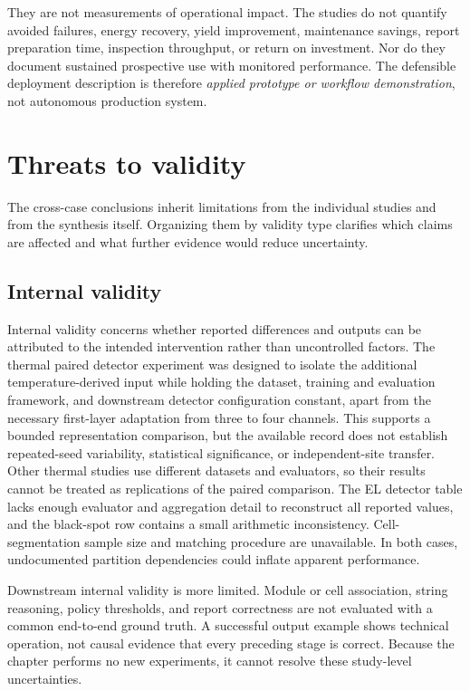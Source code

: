 \documentclass[12pt,a4paper]{report}
\begin{document}
They are not measurements of operational impact. The studies do not quantify avoided failures, energy recovery, yield improvement, maintenance savings, report preparation time, inspection throughput, or return on investment. Nor do they document sustained prospective use with monitored performance. The defensible deployment description is therefore \emph{applied prototype or workflow demonstration}, not autonomous production system.

\section{Threats to validity}
\label{sec:ch07-validity}

The cross-case conclusions inherit limitations from the individual studies and from the synthesis itself. Organizing them by validity type clarifies which claims are affected and what further evidence would reduce uncertainty.

\subsection{Internal validity}

Internal validity concerns whether reported differences and outputs can be attributed to the intended intervention rather than uncontrolled factors. The thermal paired detector experiment was designed to isolate the additional temperature-derived input while holding the dataset, training and evaluation framework, and downstream detector configuration constant, apart from the necessary first-layer adaptation from three to four channels. This supports a bounded representation comparison, but the available record does not establish repeated-seed variability, statistical significance, or independent-site transfer. Other thermal studies use different datasets and evaluators, so their results cannot be treated as replications of the paired comparison. The EL detector table lacks enough evaluator and aggregation detail to reconstruct all reported values, and the black-spot row contains a small arithmetic inconsistency. Cell-segmentation sample size and matching procedure are unavailable. In both cases, undocumented partition dependencies could inflate apparent performance.

Downstream internal validity is more limited. Module or cell association, string reasoning, policy thresholds, and report correctness are not evaluated with a common end-to-end ground truth. A successful output example shows technical operation, not causal evidence that every preceding stage is correct. Because the chapter performs no new experiments, it cannot resolve these study-level uncertainties.
\end{document}
